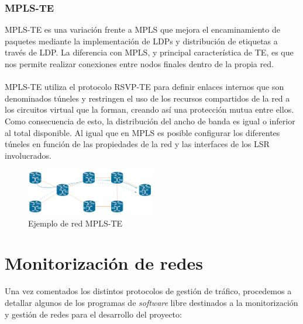 	 \subsubsection{MPLS-TE}
	 MPLS-TE es una variación frente a MPLS que mejora el encaminamiento de paquetes mediante la implementación de LDPs y distribución de etiquetas a través de LDP. La diferencia con MPLS, y principal característica de TE, es que nos permite realizar conexiones entre nodos finales dentro de la propia red. \\\\
	 MPLS-TE utiliza el protocolo RSVP-TE para definir enlaces internos que son denominados túneles y restringen el uso de los recursos compartidos de la red a los circuitos virtual que la forman, creando así una protección mutua entre ellos. Como consecuencia de esto, la distribución del ancho de banda es igual o inferior al total disponible. Al igual que en MPLS es posible configurar los diferentes túneles en función de las propiedades de la red y las interfaces de los LSR involucrados.
	 
	 \begin{figure}[H]
			\centering
			\includegraphics[width=0.5\textwidth]{img/MPLS-TE.png}
			\caption{Ejemplo de red MPLS-TE}
			\label{mplste}
		\end{figure}
		

	\section{Monitorización de redes}
	Una vez comentados los distintos protocolos de gestión de tráfico, procedemos a detallar algunos de los programas de \textit{software} libre destinados a la monitorización y gestión de redes para el desarrollo del proyecto:
	  
